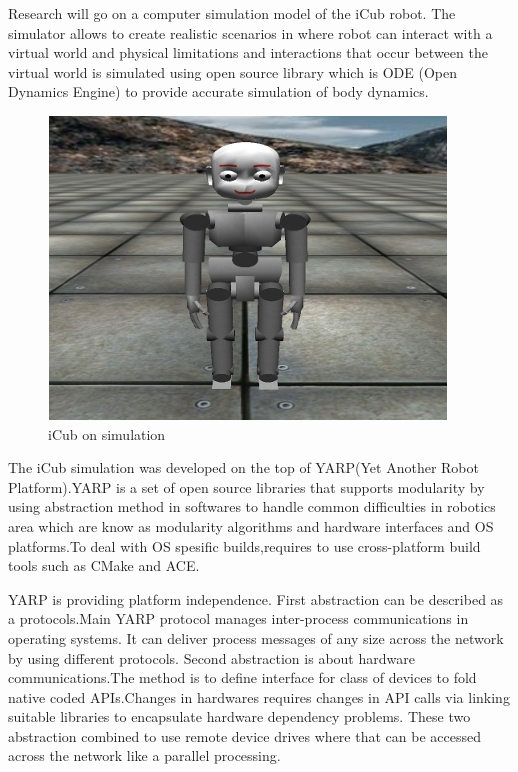 \documentclass[reqno,12pt,oneside]{report}
\begin{document}
Research will go on a computer simulation model of the iCub robot. The simulator allows to create realistic scenarios in where robot can interact with a virtual world and physical limitations and interactions that occur between the virtual world is simulated using open source library which is ODE (Open Dynamics Engine) to provide accurate simulation of body dynamics. 
\begin{figure}[!h]
\begin{center}
\includegraphics[scale=1.3]{iCubSim.jpg}
\caption{iCub on simulation}
\end{center}
\end{figure}
The iCub simulation was developed on the top of YARP(Yet Another Robot Platform)\cite{yarp}.YARP is a set of open source libraries that supports modularity by using abstraction method in softwares to handle common difficulties in robotics area which are know as modularity algorithms and hardware interfaces and OS platforms.To deal with OS spesific builds,requires to use cross-platform build tools such as CMake\cite{cmake} and ACE\cite{ace}.

YARP is providing platform independence. First abstraction can be described as a protocols.Main YARP protocol manages inter-process communications in operating systems. It can deliver process messages of any size across the network by using different protocols.
\newpage
Second abstraction is about hardware communications.The method is to define interface for class of devices to fold native coded APIs.Changes in hardwares requires changes in API calls via linking suitable libraries to encapsulate hardware dependency problems. 
These two abstraction combined to use remote device drives where that can be accessed across the network like a parallel processing.
\end{document}
